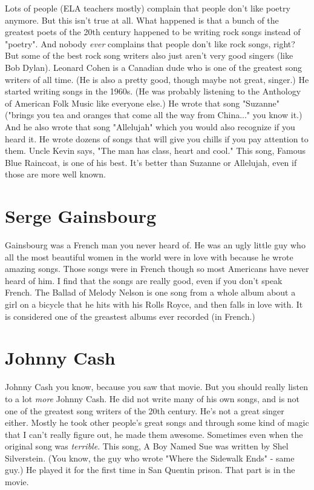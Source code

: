 \documentclass[letterpaper,12pt,single]{article}
\begin{document}
Lots of people (ELA teachers mostly) complain that people don't like poetry anymore. But this isn't true at all. What happened is that a bunch of the greatest poets of the 20th century happened to be writing rock songs instead of "poetry". And nobody \emph{ever} complains that people don't like rock songs, right? But some of the best rock song writers also just aren't very good singers (like Bob Dylan). Leonard Cohen is a Canadian dude who is one of the greatest song writers of all time. (He is also a pretty good, though maybe not great, singer.) He started writing songs in the 1960s. (He was probably listening to the Anthology of American Folk Music like everyone else.) He wrote that song "Suzanne" ("brings you tea and oranges that come all the way from China..." you know it.) And he also wrote that song "Allelujah" which you would also recognize if you heard it. He wrote dozens of songs that will give you chills if you pay attention to them. Uncle Kevin says, "The man has class, heart and cool." This song, Famous Blue Raincoat, is one of his best. It's better than Suzanne or Allelujah, even if those are more well known.

\section{Serge Gainsbourg}

Gainsbourg was a French man you never heard of. He was an ugly little guy who all the most beautiful women in the world were in love with because he wrote amazing songs. Those songs were in French though so most Americans have never heard of him. I find that the songs are really good, even if you don't speak French. The Ballad of Melody Nelson is one song from a whole album about a girl on a bicycle that he hits with his Rolls Royce, and then falls in love with. It is considered one of the greastest albums ever recorded (in French.)

\section{Johnny Cash}

Johnny Cash you know, because you saw that movie. But you should really listen to a lot \emph{more} Johnny Cash. He did not write many of his own songs, and is not one of the greatest song writers of the 20th century. He's not a great singer either. Mostly he took other people's great songs and through some kind of magic that I can't really figure out, he made them awesome. Sometimes even when the original song was \emph{terrible}. This song, A Boy Named Sue was written by Shel Silverstein. (You know, the guy who wrote "Where the Sidewalk Ends" - same guy.) He played it for the first time in San Quentin prison. That part is in the movie.
\end{document}
